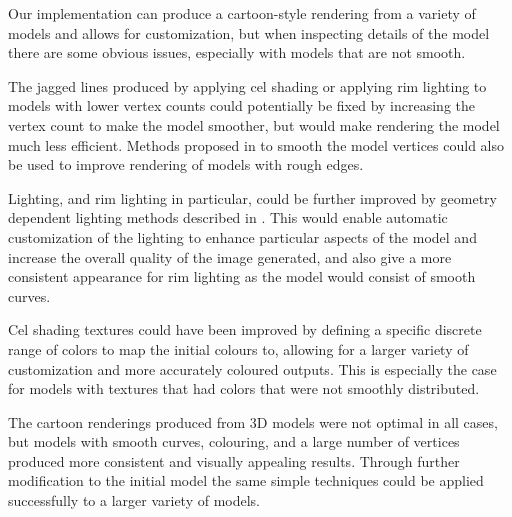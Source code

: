 Our implementation can produce a cartoon-style rendering from a variety of models and allows for customization, but when inspecting details of the model there are some obvious issues, especially with models that are not smooth.

The jagged lines produced by applying cel shading or applying rim lighting to models with lower vertex counts could potentially be fixed by increasing the vertex count to make the model smoother, but would make rendering the model much less efficient. Methods proposed in  \cite{riyad16} to smooth the model vertices could also be used to improve rendering of models with rough edges. 

Lighting, and rim lighting in particular, could be further improved by geometry dependent lighting methods described in \cite{lee06}. This would enable automatic customization of the lighting to enhance particular aspects of the model and increase the overall quality of the image generated, and also give a more consistent appearance for rim lighting as the model would consist of smooth curves.

Cel shading textures could have been improved by defining a specific discrete range of colors to map the initial colours to, allowing for a larger variety of customization and more accurately coloured outputs. This is especially the case for models with textures that had colors that were not smoothly distributed.

The cartoon renderings produced from 3D models were not optimal in all cases, but models with smooth curves, colouring, and a large number of vertices produced more consistent and visually appealing results. Through further modification to the initial model the same simple techniques could be applied successfully to a larger variety of models.